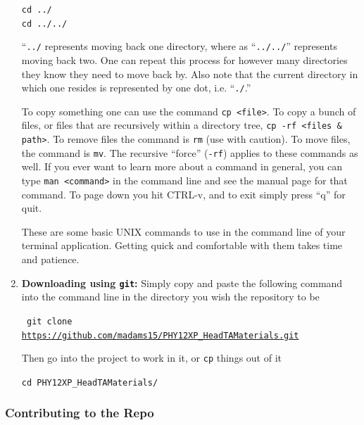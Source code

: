\documentclass[12pt]{article}
\begin{document}
\begin{enumerate}
\begin{mdframed}[style=CommandFrame]
\texttt{cd ../ \\
 cd ../../}
\end{mdframed}

\noindent ``\texttt{../} represents moving back one directory, where as ``\texttt{../../}'' represents moving back two. One can repeat this process for however many directories they know they need to move back by. Also note that the current directory in which one resides is represented by one dot, i.e. ``\texttt{./}.'' 

To copy something one can use the command \texttt{cp <file>}. To copy a bunch of files, or files that are recursively within a directory tree, \texttt{cp -rf <files \& path>}. To remove files the command is \texttt{rm} (use with caution). To move files, the command is \texttt{mv}. The recursive ``force'' (\texttt{-rf}) applies to these commands as well. If you ever want to learn more about a command in general, you can type \texttt{man <command>} in the command line and see the manual page for that command. To page down you hit CTRL-v, and to exit simply press ``q'' for quit.

These are some basic UNIX commands to use in the command line of your terminal application. Getting quick and comfortable with them takes time and patience.

\item \textbf{Downloading using \texttt{git}: } Simply copy and paste the following command into the command line in the directory you wish the repository to be
\begin{mdframed}[style=CommandFrame]
\texttt{ git clone \\ \url{https://github.com/madams15/PHY12XP\_HeadTAMaterials.git}}
\end{mdframed}

\noindent Then go into the project to work in it, or \texttt{cp} things out of it

\begin{mdframed}[style=CommandFrame]
\texttt{cd PHY12XP\_HeadTAMaterials/}
\end{mdframed}

\end{enumerate}

\subsubsection{Contributing to the Repo} \label{sec:contributions}
\end{document}
